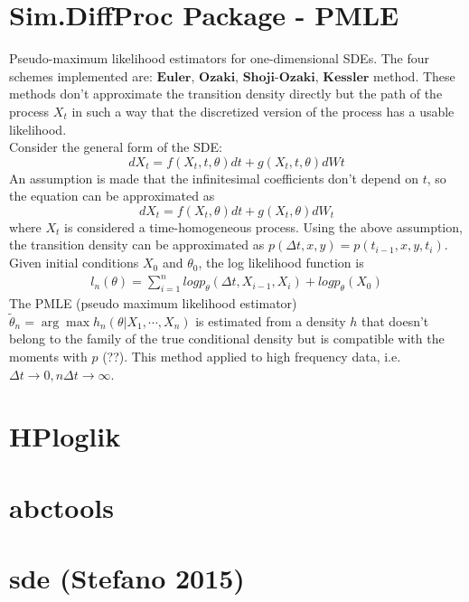 \documentclass[a4paper,11pt]{article}\usepackage[]{graphicx}\usepackage[]{color}
\begin{document}
\section{Sim.DiffProc Package - PMLE}
Pseudo-maximum likelihood estimators for one-dimensional SDEs. The four schemes implemented are: $\textbf{Euler}$, $\textbf{Ozaki}$, $\textbf{Shoji-Ozaki}$, $\textbf{Kessler}$ method. These methods don't approximate the transition density directly but the path of the process $X_t$ in such a way that the discretized version of the process has a usable likelihood. \\

Consider the general form of the SDE:
\begin{equation}
dX_t = f(X_t, t, \theta)dt + g(X_t, t, \theta)dWt
\end{equation}
An assumption is made that the infinitesimal coefficients don't depend on $t$, so the equation can be approximated as
\begin{equation}
dX_t = f(X_t, \theta) dt + g(X_t, \theta)dW_t
\end{equation}
where $X_t$ is considered a time-homogeneous process. Using the above assumption, the transition density can be approximated as $p(\Delta t, x, y) = p(t_{i-1}, x, y, t_i)$. Given initial conditions $X_0$ and $\theta_0$, the log likelihood function is 
\begin{align*}
l_n (\theta) = \sum_{i=1}^{n} log p_{\theta} (\Delta t, X_{i-1}, X_i) + log p_{\theta} (X_0)
\end{align*}
The PMLE (pseudo maximum likelihood estimator) $\tilde{\theta}_n = \arg \max h_n(\theta | X_1, \cdots, X_n)$ is estimated from a density $h$ that doesn't belong to the family of the true conditional density but is compatible with the moments with $p$ (??). This method applied to high frequency data, i.e. $\Delta t \to 0, n\Delta t \to \infty$.


\section{HPloglik}

\section{abctools}

\section{sde (Stefano 2015)} 
\end{document}
